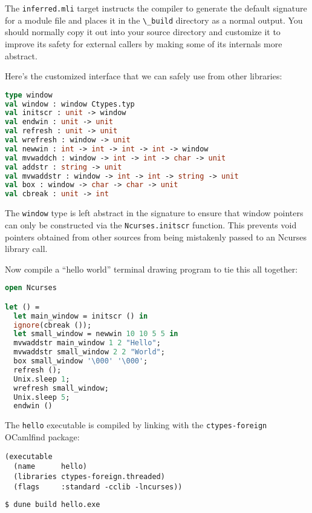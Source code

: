 The \passthrough{\lstinline!inferred.mli!} target instructs the compiler
to generate the default signature for a module file and places it in the
\passthrough{\lstinline!\_build!} directory as a normal output. You
should normally copy it out into your source directory and customize it
to improve its safety for external callers by making some of its
internals more abstract.

Here's the customized interface that we can safely use from other
libraries:

\begin{lstlisting}[language=Caml]
type window
val window : window Ctypes.typ
val initscr : unit -> window
val endwin : unit -> unit
val refresh : unit -> unit
val wrefresh : window -> unit
val newwin : int -> int -> int -> int -> window
val mvwaddch : window -> int -> int -> char -> unit
val addstr : string -> unit
val mvwaddstr : window -> int -> int -> string -> unit
val box : window -> char -> char -> unit
val cbreak : unit -> int
\end{lstlisting}

The \passthrough{\lstinline!window!} type is left abstract in the
signature to ensure that window pointers can only be constructed via the
\passthrough{\lstinline!Ncurses.initscr!} function. This prevents void
pointers obtained from other sources from being mistakenly passed to an
Ncurses library call.

Now compile a ``hello world'' terminal drawing program to tie this all
together:

\begin{lstlisting}[language=Caml]
open Ncurses

let () =
  let main_window = initscr () in
  ignore(cbreak ());
  let small_window = newwin 10 10 5 5 in
  mvwaddstr main_window 1 2 "Hello";
  mvwaddstr small_window 2 2 "World";
  box small_window '\000' '\000';
  refresh ();
  Unix.sleep 1;
  wrefresh small_window;
  Unix.sleep 5;
  endwin ()
\end{lstlisting}

The \passthrough{\lstinline!hello!} executable is compiled by linking
with the \passthrough{\lstinline!ctypes-foreign!} OCamlfind package:

\begin{lstlisting}
(executable
  (name      hello)
  (libraries ctypes-foreign.threaded)
  (flags     :standard -cclib -lncurses))
\end{lstlisting}

\begin{lstlisting}[language=bash]
$ dune build hello.exe
\end{lstlisting}

